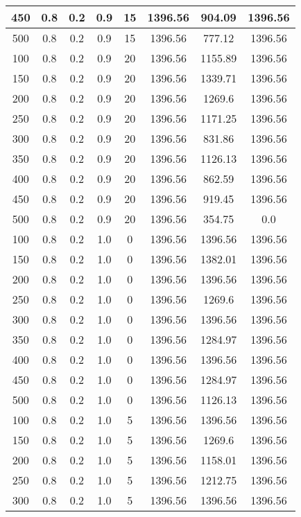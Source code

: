 \documentclass[a4paper, 12pt]{extreport}
\begin{document}
\begin{itemize}
\begin{longtable}{|c|c|c|c|c|c|c|c|}
			450 & 0.8 & 0.2 & 0.9 & 15 & 1396.56 & 904.09 & 1396.56 \\\hline
			500 & 0.8 & 0.2 & 0.9 & 15 & 1396.56 & 777.12 & 1396.56 \\\hline
			100 & 0.8 & 0.2 & 0.9 & 20 & 1396.56 & 1155.89 & 1396.56 \\\hline
			150 & 0.8 & 0.2 & 0.9 & 20 & 1396.56 & 1339.71 & 1396.56 \\\hline
			200 & 0.8 & 0.2 & 0.9 & 20 & 1396.56 & 1269.6 & 1396.56 \\\hline
			250 & 0.8 & 0.2 & 0.9 & 20 & 1396.56 & 1171.25 & 1396.56 \\\hline
			300 & 0.8 & 0.2 & 0.9 & 20 & 1396.56 & 831.86 & 1396.56 \\\hline
			350 & 0.8 & 0.2 & 0.9 & 20 & 1396.56 & 1126.13 & 1396.56 \\\hline
			400 & 0.8 & 0.2 & 0.9 & 20 & 1396.56 & 862.59 & 1396.56 \\\hline
			450 & 0.8 & 0.2 & 0.9 & 20 & 1396.56 & 919.45 & 1396.56 \\\hline
			500 & 0.8 & 0.2 & 0.9 & 20 & 1396.56 & 354.75 & 0.0 \\\hline
			100 & 0.8 & 0.2 & 1.0 & 0 & 1396.56 & 1396.56 & 1396.56 \\\hline
			150 & 0.8 & 0.2 & 1.0 & 0 & 1396.56 & 1382.01 & 1396.56 \\\hline
			200 & 0.8 & 0.2 & 1.0 & 0 & 1396.56 & 1396.56 & 1396.56 \\\hline
			250 & 0.8 & 0.2 & 1.0 & 0 & 1396.56 & 1269.6 & 1396.56 \\\hline
			300 & 0.8 & 0.2 & 1.0 & 0 & 1396.56 & 1396.56 & 1396.56 \\\hline
			350 & 0.8 & 0.2 & 1.0 & 0 & 1396.56 & 1284.97 & 1396.56 \\\hline
			400 & 0.8 & 0.2 & 1.0 & 0 & 1396.56 & 1396.56 & 1396.56 \\\hline
			450 & 0.8 & 0.2 & 1.0 & 0 & 1396.56 & 1284.97 & 1396.56 \\\hline
			500 & 0.8 & 0.2 & 1.0 & 0 & 1396.56 & 1126.13 & 1396.56 \\\hline
			100 & 0.8 & 0.2 & 1.0 & 5 & 1396.56 & 1396.56 & 1396.56 \\\hline
			150 & 0.8 & 0.2 & 1.0 & 5 & 1396.56 & 1269.6 & 1396.56 \\\hline
			200 & 0.8 & 0.2 & 1.0 & 5 & 1396.56 & 1158.01 & 1396.56 \\\hline
			250 & 0.8 & 0.2 & 1.0 & 5 & 1396.56 & 1212.75 & 1396.56 \\\hline
			300 & 0.8 & 0.2 & 1.0 & 5 & 1396.56 & 1396.56 & 1396.56 \\\hline

\end{longtable}
\end{itemize}
\end{document}
